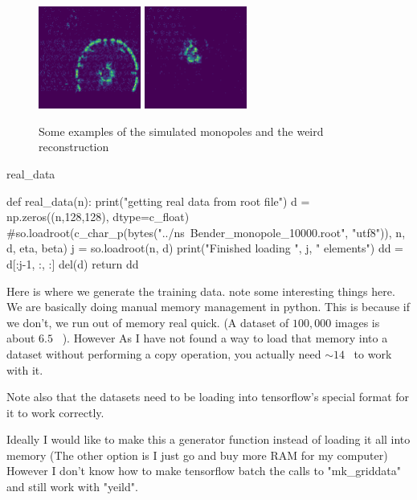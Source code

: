 \documentclass[10pt, a4paper]{article}
\begin{document}
\begin{figure}[h]
\centering
\includegraphics[width=0.3\textwidth]{Images/0.png}
\includegraphics[width=0.3\textwidth]{Images/1.png}
\caption{Some examples of the simulated monopoles and the weird reconstruction}
\end{figure}

\begin{codeblock}{real_data}
\begin{code}
def real_data(n):
	print("getting real data from root file")
	d = np.zeros((n,128,128), dtype=c_float)
	#so.loadroot(c_char_p(bytes("../ns~Bender_monopole_10000.root", "utf8")), n, d, eta, beta)
	j = so.loadroot(n, d)
	print("Finished loading ", j, " elements")
	dd = d[:j-1, :, :]
	del(d)
	return dd 
\end{code}
\end{codeblock}

Here is where we generate the training data. note some interesting things here. We are basically doing manual memory management in python. This is because if we don't, we run out of memory real quick. (A dataset of $100,000$ images is about $6.5$ \si{\gibi \byte}). However As I have not found a way to load that memory into a dataset without performing a copy operation, you actually need $\sim14$\si{\gibi \byte} to work with it. 

Note also that the datasets need to be loading into tensorflow's special format for it to work correctly. 

Ideally I would like to make this a generator function instead of loading it all into memory (The other option is I just go and buy more RAM for my computer) However I don't know how to make tensorflow batch the calls to "mk_griddata" and still work with "yeild".
\end{document}
